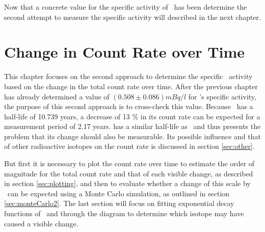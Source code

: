 \documentclass[encoding=utf8,british]{tumphthesis}
\begin{document}
Now that a concrete value for the specific activity of \Kr\ has been determine the second attempt to measure the specific activity will described in the next chapter.
\\  
\fi































\chapter{Change in Count Rate over Time}
\label{sec:SAfromDecrease}

This chapter focuses on the second approach to determine the specific \Kr\ activity based on the change in the total count rate over time.
After the previous chapter has already determined a value of $(0.508\pm0.086) \unit{mBq}/\unit{l}$ for \Kr's specific activity, the purpose of this second approach is to cross-check this value.
Because \Kr\ has a half-life of 10.739 years, a decrease of 13 $ \% $ in its count rate can be expected for a measurement period of 2.17 years.
 has a similar half-life as \Kr\ and thus presents the problem that its change should also be measurable.
Its possible influence and that of other radioactive isotopes on the count rate is discussed in section \ref{sec:other}. 

But first it is necessary to plot the count rate over time to estimate the order of magnitude for the total count rate and that of each visible change, as described in section \ref{sec:plotting}, and then to evaluate whether a change of this scale by \Kr\ can be expected using a Monte Carlo simulation, as outlined in section \ref{sec:monteCarlo2}.
The last section will focus on fitting exponential decay functions of \Kr\ and  through the diagram to determine which isotope may have caused a visible change.   
\\
\end{document}

